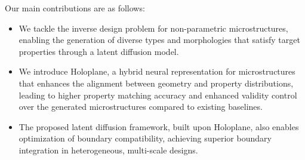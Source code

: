 Our main contributions are as follows:  
\begin{itemize}[nosep]
\item We tackle the inverse design problem for non-parametric microstructures, enabling the generation of diverse types and morphologies that satisfy target properties through a latent diffusion model.

\item We introduce Holoplane, a hybrid neural representation for microstructures that enhances the alignment between geometry and property distributions, leading to higher property matching accuracy and enhanced validity control over the generated microstructures compared to existing baselines.

\item The proposed latent diffusion framework, built upon Holoplane, also enables optimization of boundary compatibility, achieving superior boundary integration in heterogeneous, multi-scale designs.

\end{itemize}  


